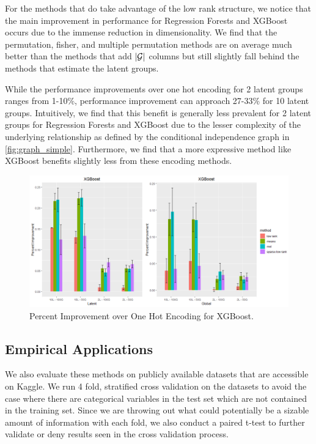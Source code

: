\documentclass{article}
\theoremstyle{plain}
\theoremstyle{definition}
\theoremstyle{remark}
\begin{document}
For the methods that do take advantage of the low rank structure, we notice that the main improvement in performance for Regression Forests and XGBoost occurs due to the immense reduction in dimensionality. We find that the permutation, fisher, and multiple permutation methods are on average much better than the methods that add $|\mathcal{G}|$ columns but still slightly fall behind the methods that estimate the latent groups. 

While the performance improvements over one hot encoding for 2 latent groups ranges from 1-10\%, performance improvement can approach 27-33\% for 10 latent groups. Intuitively, we find that this benefit is generally less prevalent for 2 latent groups for Regression Forests and XGBoost due to the lesser complexity of the underlying relationship as defined by the conditional independence graph in \ref{fig:graph_simple}. Furthermore, we find that a more expressive method like XGBoost benefits slightly less from these encoding methods. 

\begin{figure}[htbp]
	\centering
	\includegraphics[width=\linewidth]{figures/xgboost_sims.png}
	\caption {Percent Improvement over One Hot Encoding for XGBoost.}
	\label{tab:rf_sim_setups}
\end{figure}



\subsection{Empirical Applications}
\label{sec:empirical_applications}

We also evaluate these methods on publicly available datasets that are accessible on Kaggle. We run 4 fold, stratified cross validation on the datasets to avoid the case where there are categorical variables in the test set which are not contained in the training set. Since we are throwing out what could potentially be a sizable amount of information with each fold, we also conduct a paired t-test to further validate or deny results seen in the cross validation process.
\end{document}
